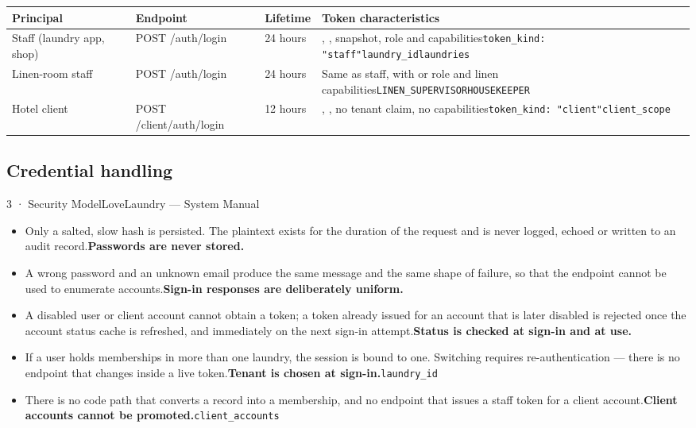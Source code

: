 \documentclass[11pt,a4paper,oneside]{book}
\begin{document}
\begin{center}\small
\begin{tabularx}{\linewidth}{|X|X|X|X|}
\hline
\rowcolor{lightgrey}
\textbf{Principal} & \textbf{Endpoint} & \textbf{Lifetime} & \textbf{Token characteristics} \\ \hline
Staff (laundry app, shop) & POST /auth/login & 24 hours & , ,  snapshot, role and capabilities\texttt{token\_kind: "staff"}\texttt{laundry\_id}\texttt{laundries} \\ \hline
Linen-room staff & POST /auth/login & 24 hours & Same as staff, with  or  role and linen capabilities\texttt{LINEN\_SUPERVISOR}\texttt{HOUSEKEEPER} \\ \hline
Hotel client & POST /client/auth/login & 12 hours & , , no tenant claim, no capabilities\texttt{token\_kind: "client"}\texttt{client\_scope} \\ \hline
\end{tabularx}
\end{center}
\subsection*{Credential handling}
3 · Security ModelLoveLaundry — System Manual

\begin{itemize}
\item Only a salted, slow hash is persisted. The plaintext exists for the duration of the request and is never logged, echoed or written to an audit record.\textbf{Passwords are never stored.}
\item A wrong password and an unknown email produce the same message and the same shape of failure, so that the endpoint cannot be used to enumerate accounts.\textbf{Sign-in responses are deliberately uniform.}
\item A disabled user or client account cannot obtain a token; a token already issued for an account that is later disabled is rejected once the account status cache is refreshed, and immediately on the next sign-in attempt.\textbf{Status is checked at sign-in and at use.}
\item If a user holds memberships in more than one laundry, the session is bound to one. Switching requires re-authentication — there is no endpoint that changes  inside a live token.\textbf{Tenant is chosen at sign-in.}\texttt{laundry\_id}
\item There is no code path that converts a  record into a membership, and no endpoint that issues a staff token for a client account.\textbf{Client accounts cannot be promoted.}\texttt{client\_accounts}
\end{itemize}
\end{document}
